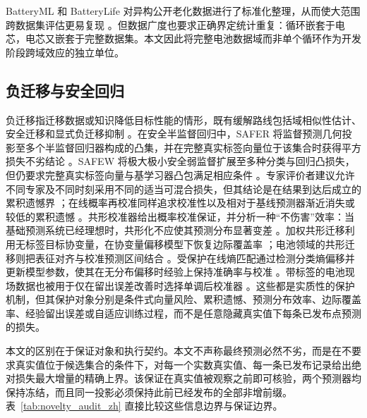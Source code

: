 \documentclass[UTF8,11pt]{ctexart}
\begin{document}
BatteryML 和 BatteryLife 对异构公开老化数据进行了标准化整理，从而使大范围跨数据集评估更易复现 \citep{zhang2024batteryml,tan2025batterylife}。但数据广度也要求正确界定统计重复：循环嵌套于电芯，电芯又嵌套于完整数据集。本文因此将完整电池数据域而非单个循环作为开发阶段跨域效应的独立单位。

\subsection{负迁移与安全回归}

负迁移指迁移数据或知识降低目标性能的情形，既有缓解路线包括域相似性估计、安全迁移和显式负迁移抑制 \citep{zhang2023negative}。在安全半监督回归中，SAFER 将监督预测几何投影至多个半监督回归器构成的凸集，并在完整真实标签向量位于该集合时获得平方损失不劣结论 \citep{li2017safer}。SAFEW 将极大极小安全弱监督扩展至多种分类与回归凸损失，但仍要求完整真实标签向量与基学习器凸包满足相应条件 \citep{li2021safeweak}。专家评价者建议允许不同专家及不同时刻采用不同的适当可混合损失，但其结论是在结果到达后成立的累积遗憾界 \citep{chernov2009evaluators}；在线概率再校准同样追求校准性以及相对于基线预测器渐近消失或较低的累积遗憾 \citep{marx2025calibrated,deshpande2025calibrated}。共形校准器给出概率校准保证，并分析一种“不伤害”效率：当基础预测系统已经理想时，共形化不应使其预测分布显著变差 \citep{vovk2020conformal}。加权共形迁移利用无标签目标协变量，在协变量偏移模型下恢复边际覆盖率 \citep{tuwani2023transport}；电池领域的共形迁移则把表征对齐与校准预测区间结合 \citep{filgueira2026conformalized}。受保护在线熵匹配通过检测分类熵偏移并更新模型参数，使其在无分布偏移时经验上保持准确率与校准 \citep{bar2024protected}。带标签的电池现场数据也被用于仅在留出误差改善时选择单调后校准器 \citep{nyachionjeka2026safecalibrated}。这些都是实质性的保护机制，但其保护对象分别是条件式向量风险、累积遗憾、预测分布效率、边际覆盖率、经验留出误差或自适应训练过程，而不是任意隐藏真实值下每条已发布点预测的损失。

本文的区别在于保证对象和执行契约。本文不声称最终预测必然不劣，而是在不要求真实值位于候选集合的条件下，对每一个实数真实值、每一条已发布记录给出绝对损失最大增量的精确上界。该保证在真实值被观察之前即可核验，两个预测器均保持冻结，而且同一投影必须保持此前已经发布的全部非增前缀。表~\ref{tab:novelty_audit_zh} 直接比较这些信息边界与保证边界。
\end{document}
